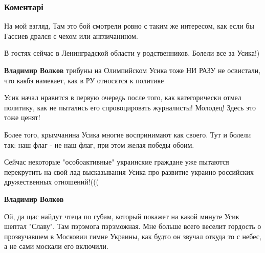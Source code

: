  
 
 
 
 
\subsubsection{Коментарі}
\label{sec:22_07_2018.fb.lesev_igor.1.boks_usik_gassiev.cmt}

\begin{itemize} %
На мой взгляд, Там это бой смотрели ровно с таким же интересом, как если бы Гассиев дрался с чехом или англичанином.

\begin{itemize} %
В гостях сейчас в Ленинградской области у родственников. Болели все за Усика!)

\textbf{Владимир Волков} трибуны на Олимпийском Усика тоже НИ РАЗУ не освистали, что какбэ намекает, как в РУ относятся к политике


Усик начал нравится в первую очередь после того, как категорически отмел
политику, как не пытались его спровоцировать журналисты!
Молодец! Здесь это тоже ценят!

Более того, крымчанина Усика многие воспринимают как своего. Тут и болели так: наш флаг - не наш флаг, при этом желая победы обоим.


Сейчас некоторые "особоактивные" украинские граждане уже пытаются перекрутить
на свой лад высказывания Усика про развитие украино-российских дружественных
отношений!(((


\textbf{Владимир Волков} 

Ой, да щас найдут чтеца по губам, который покажет на какой минуте Усик шептал
"Славу". Там пэрэмога пэрэможная. Мне больше всего веселит гордость о
прозвучавшем в Московии гимне Украины, как будто он звучал откуда то с небес, а
не сами москали его включили.

\end{itemize} %

\end{itemize} %
